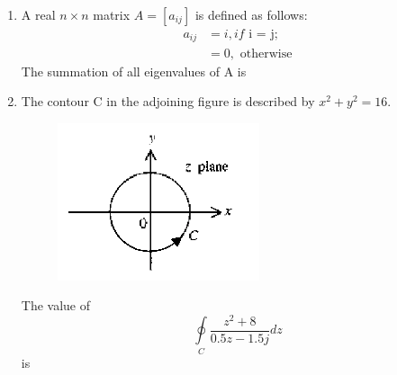 \documentclass[journal,12pt,onecolumn]{IEEEtran}
\theoremstyle{remark}
\begin{document}
\begin{enumerate}
\item A real $n \times n$ matrix $A = [a_{ij}]$ is defined as follows: \newline 
\begin{align*}
    a_{ij} &=i, if \text{ i = j}; \\
    &= 0, \text{ otherwise}
\end{align*}
The summation of all eigenvalues of A is

\hfill{}
\begin{enumerate}
\end{enumerate}

\item The contour C in the adjoining figure is described by $x^2 + y^2 = 16$.\\ 
\begin{minipage}{0.45\columnwidth}
\begin{figure}[H]
    \centering
    \includegraphics[width = 0.6\columnwidth]{q14}
    \caption*{}
    \label{Q14}
\end{figure}
\end{minipage}
\hspace{0.05\columnwidth}
\begin{minipage}{0.45\columnwidth}
The value of $$\oint\limits_{C} \frac{z^2+8}{0.5z - 1.5j} dz$$ is 
\end{minipage}

\hfill{}
\begin{enumerate}
\end{enumerate}


\end{enumerate}
\end{document}
